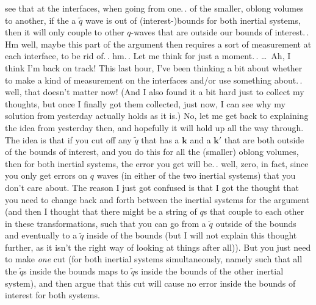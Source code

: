 \documentclass{report}
\begin{document}
see that at the interfaces, when going from one.\,. of the smaller, oblong volumes to another, if the a $\tilde q$ wave is out of (interest-)bounds for both inertial systems, then it will only couple to other $q$-waves that are outside our bounds of interest.\,. Hm well, maybe this part of the argument then requires a sort of measurement at each interface, to be rid of.\,. hm.\,. Let me think for just a moment.\,. %
\ldots\ Ah, I think I'm back on track! This last hour, I've been thinking a bit about whether to make a kind of measurement on the interfaces and/or use something about.\,. well, that doesn't matter now! (And I also found it a bit hard just to collect my thoughts, but once I finally got them collected, just now, I can see why my solution from yesterday actually holds as it is.) No, let me get back to explaining the idea from yesterday then, and hopefully it will hold up all the way through. The idea is that if you cut off any $\tilde q$ that has a $\boldsymbol{k}$ and a $\boldsymbol{k}'$ that are both outside of the bounds of interest, and you do this for all the (smaller) oblong volumes, then for both inertial systems, the error you get will be.\,. well, zero, in fact, since you only get errors on $q$ waves (in either of the two inertial systems) that you don't care about. The reason I just got confused is that I got the thought that you need to change back and forth between the inertial systems for the argument (and then I thought that there might be a string of $q$s that couple to each other in these transformations, such that you can go from a $\tilde q$ outside of the bounds and eventually to a $\tilde q$ inside of the bounds (but I will not explain this thought further, as it isn't the right way of looking at things after all)). But you just need to make \emph{one} cut (for both inertial systems simultaneously, namely such that all the $\tilde q$s inside the bounds maps to $\tilde q$s inside the bounds of the other inertial system), and then argue that this cut will cause no error inside the bounds of interest for both systems. %
\end{document}
